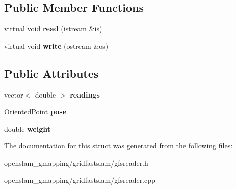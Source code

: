 \subsection*{Public Member Functions}
\begin{DoxyCompactItemize}
\item 
\mbox{\label{structGMapping_1_1GFSReader_1_1LaserRecord_ae2db8f0e481a7822ff92c041eba0202f}} 
virtual void {\bfseries read} (istream \&is)
\item 
\mbox{\label{structGMapping_1_1GFSReader_1_1LaserRecord_abfebc4f46fc3c15be06d18b6f0295e93}} 
virtual void {\bfseries write} (ostream \&os)
\end{DoxyCompactItemize}
\subsection*{Public Attributes}
\begin{DoxyCompactItemize}
\item 
\mbox{\label{structGMapping_1_1GFSReader_1_1LaserRecord_a07d15f1ec2bbff91d72b44b35745521a}} 
vector$<$ double $>$ {\bfseries readings}
\item 
\mbox{\label{structGMapping_1_1GFSReader_1_1LaserRecord_a193fc9305bcc987dfddd16f85c342c5e}} 
\hyperlink{structGMapping_1_1orientedpoint}{Oriented\+Point} {\bfseries pose}
\item 
\mbox{\label{structGMapping_1_1GFSReader_1_1LaserRecord_ae276ea2bc6c93147c578872bb5f3fe50}} 
double {\bfseries weight}
\end{DoxyCompactItemize}


The documentation for this struct was generated from the following files\+:\begin{DoxyCompactItemize}
\item 
openslam\+\_\+gmapping/gridfastslam/gfsreader.\+h\item 
openslam\+\_\+gmapping/gridfastslam/gfsreader.\+cpp\end{DoxyCompactItemize}
